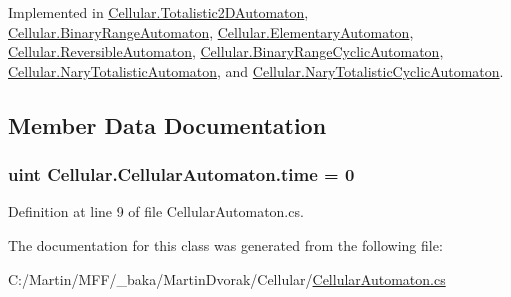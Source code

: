 Implemented in \hyperlink{class_cellular_1_1_totalistic2_d_automaton_aa009c674cd109fa70173e9893f6d3b09}{Cellular.\+Totalistic2\+D\+Automaton}, \hyperlink{class_cellular_1_1_binary_range_automaton_afad205eb4fea51efd63b063f96bfda5c}{Cellular.\+Binary\+Range\+Automaton}, \hyperlink{class_cellular_1_1_elementary_automaton_a812677139d560e2c600226361b785995}{Cellular.\+Elementary\+Automaton}, \hyperlink{class_cellular_1_1_reversible_automaton_ae394a104b5fe5a550c6c378fea92c355}{Cellular.\+Reversible\+Automaton}, \hyperlink{class_cellular_1_1_binary_range_cyclic_automaton_a75754d1c54550e1f29a9282647947cb8}{Cellular.\+Binary\+Range\+Cyclic\+Automaton}, \hyperlink{class_cellular_1_1_nary_totalistic_automaton_aa691c532a55638c7e3d0c125a4244773}{Cellular.\+Nary\+Totalistic\+Automaton}, and \hyperlink{class_cellular_1_1_nary_totalistic_cyclic_automaton_ac5c39cfb72386e3ab6132ab420091ae9}{Cellular.\+Nary\+Totalistic\+Cyclic\+Automaton}.



\subsection{Member Data Documentation}
\hypertarget{class_cellular_1_1_cellular_automaton_a6eaa8a9840fbc4c875d4e7d5a14e5f70}{}
\subsubsection[{time}]{\setlength{\rightskip}{0pt plus 5cm}uint Cellular.\+Cellular\+Automaton.\+time = 0\hspace{0.3cm}{\ttfamily [protected]}}\label{class_cellular_1_1_cellular_automaton_a6eaa8a9840fbc4c875d4e7d5a14e5f70}


Definition at line 9 of file Cellular\+Automaton.\+cs.



The documentation for this class was generated from the following file\+:\begin{DoxyCompactItemize}
\item 
C\+:/\+Martin/\+M\+F\+F/\+\_\+baka/\+Martin\+Dvorak/\+Cellular/\hyperlink{_cellular_automaton_8cs}{Cellular\+Automaton.\+cs}\end{DoxyCompactItemize}
